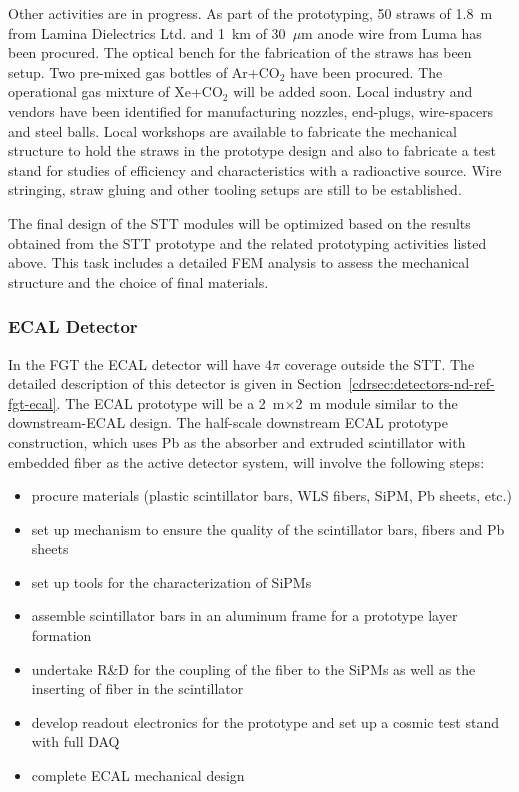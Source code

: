 Other activities are in progress. As part of the prototyping, 50 straws of 1.8~m from Lamina
Dielectrics Ltd. and 1~km of 30~$\mu$m anode wire from Luma
has been procured. The optical bench for the fabrication of the
straws has been setup.  Two pre-mixed gas bottles of Ar+CO$_2$ have been
procured. The operational gas mixture of
Xe+CO$_2$ will be added
soon. Local industry and vendors have been identified for
manufacturing nozzles, end-plugs, wire-spacers and steel
balls. Local workshops are available to fabricate the mechanical
structure to hold the straws in the prototype design and also to
fabricate a test stand for studies of efficiency and characteristics with
a radioactive source. Wire stringing, straw gluing and other tooling
setups are still to be established.


The final design of the STT modules will be optimized based on the
results obtained from the STT prototype and the related prototyping
activities listed above. This task includes a detailed FEM analysis to
assess the mechanical structure and the choice of final
materials. 



\subsubsection{ECAL Detector}

In the FGT the ECAL detector will have $4\pi$ coverage outside
the STT.  The detailed description of this
detector is given in Section~\ref{cdrsec:detectors-nd-ref-fgt-ecal}.
The ECAL prototype will be a 2~m$\times$2~m module similar to the
downstream-ECAL design.  The half-scale downstream ECAL prototype
construction, which uses Pb as the absorber and extruded scintillator
with embedded fiber as the active detector system, will involve the
following steps:
\begin{itemize}
\item procure materials (plastic scintillator bars, WLS fibers,
  SiPM, Pb sheets, etc.)
\item set up mechanism to ensure the quality of the scintillator bars,
  fibers and Pb sheets
\item set up tools for the characterization of SiPMs
\item assemble scintillator bars in an aluminum frame for a
  prototype layer formation
\item undertake R\&D for the coupling of the fiber to the SiPMs as well
  as the inserting of fiber in the scintillator
\item develop readout electronics for the prototype and set up a cosmic
  test stand with full DAQ
\item complete ECAL mechanical design 
\end{itemize}

